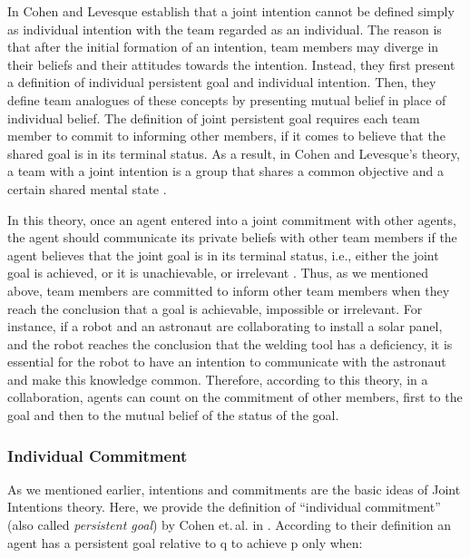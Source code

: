 \documentclass[12pt]{report}
\begin{document}
In \cite{cohen:teamwork} Cohen and Levesque establish that a joint intention
cannot be defined simply as individual intention with the team regarded as an
individual. The reason is that after the initial formation of an intention, team
members may diverge in their beliefs and their attitudes towards the intention.
Instead, they first present a definition of individual persistent goal and
individual intention. Then, they define team analogues of these concepts by
presenting mutual belief in place of individual belief. The definition of joint
persistent goal requires each team member to commit to informing other members,
if it comes to believe that the shared goal is in its terminal status. As a
result, in Cohen and Levesque's theory, a team with a joint intention is a group
that shares a common objective and a certain shared mental state
\cite{jarvis:teams-multiagent-systems}.

In this theory, once an agent entered into a joint commitment with other agents,
the agent should communicate its private beliefs with other team members if the
agent believes that the joint goal is in its terminal status, i.e., either the
joint goal is achieved, or it is unachievable, or irrelevant
\cite{wilsker:study-theories}. Thus, as we mentioned above, team members are
committed to inform other team members when they reach the conclusion that a
goal is achievable, impossible or irrelevant. For instance, if a robot and an
astronaut are collaborating to install a solar panel, and the robot reaches the
conclusion that the welding tool has a deficiency, it is essential for the robot
to have an intention to communicate with the astronaut and make this knowledge
common. Therefore, according to this theory, in a collaboration, agents can
count on the commitment of other members, first to the goal and then to the
mutual belief of the status of the goal.

\subsubsection{Individual Commitment}
\label{sec:individual-commitment}

As we mentioned earlier, intentions and commitments are the basic ideas of Joint
Intentions theory. Here, we provide the definition of ``individual commitment''
(also called \textit{persistent goal}) by Cohen et.\,al. in
\cite{cohen:team-formation}. According to their definition an agent has a
persistent goal relative to q to achieve p only when:
\end{document}
